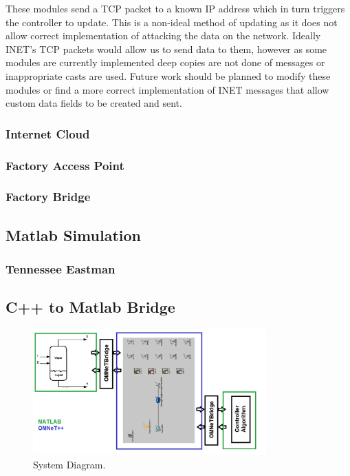 These modules send a TCP packet to a known IP address which in turn triggers the controller to update. This is a non-ideal method of updating as it does not allow correct implementation of attacking the data on the network. Ideally INET's TCP packets would allow us to send data to them, however as some modules are currently implemented deep copies are not done of messages or inappropriate casts are used. Future work should be planned to modify these modules or find a more correct
implementation of INET messages that allow custom data fields to be created and sent. 

\subsubsection{Internet Cloud}

\subsubsection{Factory Access Point}

\subsubsection{Factory Bridge}

\subsection{Matlab Simulation}

\subsubsection{Tennessee Eastman}

\subsection{C++ to Matlab Bridge}




\begin{figure}
        \centering
		\includegraphics[width=0.8\textwidth]{figs/system.png}
        \caption{System Diagram.}
        \label{fig:system}        
\end{figure}
